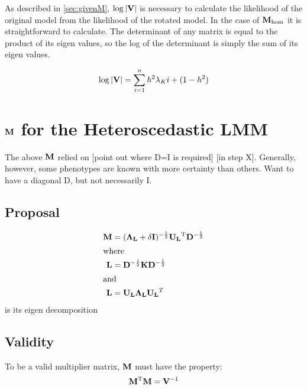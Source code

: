 As described in \cref{sec:givenM}, $\log \left| \mathbf{V} \right|$ is necessary to calculate the likelihood of the original model from the likelihood of the rotated model.
In the case of $\mathbf{M}_\text{hom}$ it is straightforward to calculate.
The determinant of any matrix is equal to the product of its eigen values, so the log of the determinant is simply the sum of its eigen values.

\begin{align}
  \log \left| \mathbf{V} \right| = \sum_{i=1}^n{h^2 \lambda_Ki + (1 - h^2)}
\end{align}


\newpage
\section{\texorpdfstring{$\mathbf{M}$}{M} for the Heteroscedastic LMM}

The above $\mathbf{M}$ relied on [point out where D=I is required] [in step X].
Generally, however, some phenotypes are known with more certainty than others.
Want to have a diagonal D, but not necessarily I.

\subsection{Proposal}

\begin{align}
	\mathbf{M} &= (\mathbf{\Lambda_L} + \delta \mathbf{I})^{-\frac{1}{2}}\mathbf{U_L}^\mathrm{T} \mathbf{D}^{-\frac{1}{2}}\\
\shortintertext{where}
	\mathbf{L} &= \mathbf{D}^{-\frac{1}{2}}\mathbf{K} \mathbf{D}^{-\frac{1}{2}}\\
\shortintertext{and}
	\mathbf{L} &= \mathbf{U_L} \mathbf{\Lambda_L} \mathbf{U_L}^T
\end{align}
is its eigen decomposition


\subsection{Validity}

To be a valid multiplier matrix, $\mathbf{M}$ must have the property:
\begin{equation}
  \mathbf{M} ^\mathrm{T} \mathbf{M} = \mathbf{V}^{-1}
\end{equation}
	






